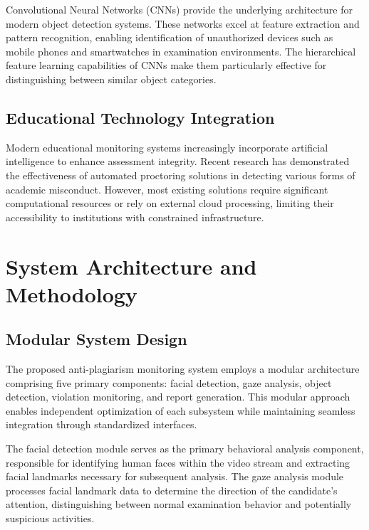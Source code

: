 \documentclass[conference]{IEEEtran}
\begin{document}
Convolutional Neural Networks (CNNs) provide the underlying architecture for modern object 
detection systems\cite{goodfellow2016deep}. These networks excel at feature extraction 
and pattern recognition, enabling identification of unauthorized devices such as mobile 
phones and smartwatches in examination environments. The hierarchical feature learning 
capabilities of CNNs make them particularly effective for distinguishing between similar 
object categories\cite{paszke2019pytorch}.

\subsection{Educational Technology Integration}

Modern educational monitoring systems increasingly incorporate artificial intelligence 
to enhance assessment integrity\cite{russell2020artificial}. Recent research has demonstrated 
the effectiveness of automated proctoring solutions in detecting various forms of academic 
misconduct\cite{honorlock2023detecting}. However, most existing solutions require significant 
computational resources or rely on external cloud processing, limiting their accessibility 
to institutions with constrained infrastructure.

\section{System Architecture and Methodology}

\subsection{Modular System Design}

The proposed anti-plagiarism monitoring system employs a modular architecture comprising 
five primary components: facial detection, gaze analysis, object detection, violation 
monitoring, and report generation. This modular approach enables independent optimization 
of each subsystem while maintaining seamless integration through standardized interfaces.

The facial detection module serves as the primary behavioral analysis component, responsible 
for identifying human faces within the video stream and extracting facial landmarks necessary 
for subsequent analysis. The gaze analysis module processes facial landmark data to determine 
the direction of the candidate's attention, distinguishing between normal examination behavior 
and potentially suspicious activities.
\end{document}
